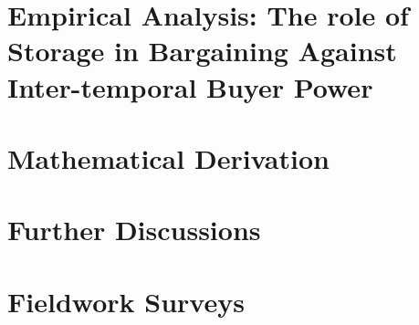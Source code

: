 \documentclass[12pt,authoryear, notitlepage]{elegantpaper}
\begin{document}
    


\newpage
\chapter{Empirical Analysis: The role of Storage in Bargaining Against Inter-temporal Buyer Power}

    



\newpage


\newpage
\appendix
\chapter{Mathematical Derivation}
    

    

    



\chapter{Further Discussions}
    
    


\chapter{Fieldwork Surveys}
    
\end{document}
